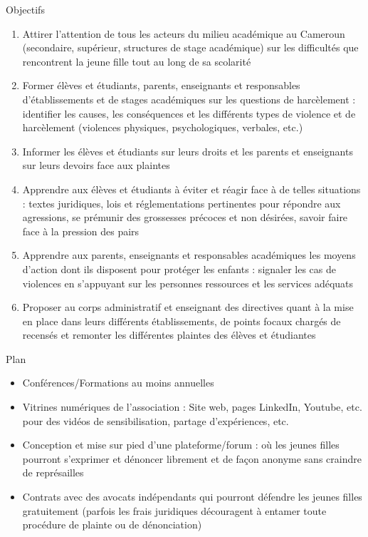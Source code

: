\documentclass[aspectratio=169,xcolor=dvipsnames]{beamer}
\begin{document}
\begin{frame}[allowframebreaks]{Objectifs}
    \begin{enumerate}
        \item Attirer l’attention de tous les acteurs du milieu académique au Cameroun (secondaire, supérieur, structures de stage académique) sur les difficultés que rencontrent la jeune fille tout au long de sa scolarité
        \item Former élèves et étudiants, parents, enseignants et responsables d’établissements et de stages académiques sur les questions de harcèlement : identifier les causes, les conséquences et les différents types de violence et de harcèlement (violences physiques, psychologiques, verbales, etc.)
        \item Informer les élèves et étudiants sur leurs droits et les parents et enseignants sur leurs devoirs face aux plaintes
        \item Apprendre aux élèves et étudiants à éviter et réagir face à de telles situations : textes juridiques, lois et réglementations pertinentes pour répondre aux agressions, se prémunir des grossesses précoces et non désirées, savoir faire face à la pression des pairs
        \item Apprendre aux parents, enseignants et responsables académiques les moyens d’action dont ils disposent pour protéger les enfants : signaler les cas de violences en s’appuyant sur les personnes ressources et les services adéquats
        \item Proposer au corps administratif et enseignant des directives quant à la mise en place dans leurs différents établissements, de points focaux chargés de recensés et remonter les différentes plaintes des élèves et étudiantes
    \end{enumerate}
\end{frame}


\begin{frame}{Plan}    
    \begin{itemize}
        \item Conférences/Formations au moins annuelles
        \pause
        \item Vitrines numériques de l'association : Site web, pages LinkedIn, Youtube, etc. pour des vidéos de sensibilisation, partage d'expériences, etc.
        \pause
        \item Conception et mise sur pied d'une plateforme/forum : où les jeunes filles pourront s’exprimer et dénoncer librement et de façon anonyme sans craindre de représailles
        \item Contrats avec des avocats indépendants qui pourront défendre les jeunes filles gratuitement (parfois les frais juridiques découragent à entamer toute procédure de plainte ou de dénonciation)
    \end{itemize}
\end{frame}
\end{document}
